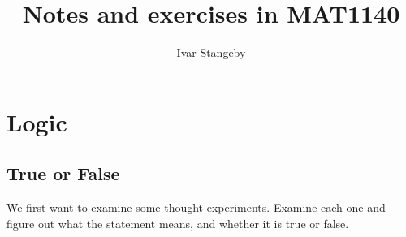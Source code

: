 \documentclass[a4paper, 11pt]{report}
\title{
  Notes and exercises in MAT1140
}
\author{
  Ivar Stangeby
}
\theoremstyle{plain}
\theoremstyle{definition}
\begin{document}
\maketitle

\tableofcontents

\chapter{Logic}
\label{cha:logic}

\section{True or False}
\label{sec:true_or_false}

We first want to examine some thought experiments. Examine each one and figure
out what the statement means, and whether it is true or false.
\end{document}
